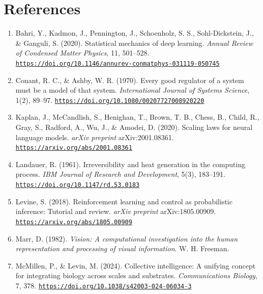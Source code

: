 \documentclass[11pt]{article}
\begin{document}
\section{References}
\begin{enumerate}
\setlength{\itemsep}{0.6em}
\item \label{ref:bahri2020}
Bahri, Y., Kadmon, J., Pennington, J., Schoenholz, S. S., Sohl-Dickstein, J., \& Ganguli, S. (2020). Statistical mechanics of deep learning. \textit{Annual Review of Condensed Matter Physics}, 11, 501--528.
\href{https://doi.org/10.1146/annurev-conmatphys-031119-050745}{\nolinkurl{https://doi.org/10.1146/annurev-conmatphys-031119-050745}}

\item \label{ref:conant1970}
Conant, R. C., \& Ashby, W. R. (1970). Every good regulator of a system must be a model of that system. \textit{International Journal of Systems Science}, 1(2), 89--97.
\href{https://doi.org/10.1080/00207727008920220}{\nolinkurl{https://doi.org/10.1080/00207727008920220}}

\item \label{ref:kaplan2020}
Kaplan, J., McCandlish, S., Henighan, T., Brown, T. B., Chess, B., Child, R., Gray, S., Radford, A., Wu, J., \& Amodei, D. (2020). Scaling laws for neural language models. \textit{arXiv preprint} arXiv:2001.08361.
\href{https://arxiv.org/abs/2001.08361}{\nolinkurl{https://arxiv.org/abs/2001.08361}}

\item \label{ref:landauer1961}
Landauer, R. (1961). Irreversibility and heat generation in the computing process. \textit{IBM Journal of Research and Development}, 5(3), 183--191.
\href{https://doi.org/10.1147/rd.53.0183}{\nolinkurl{https://doi.org/10.1147/rd.53.0183}}

\item \label{ref:levine2018}
Levine, S. (2018). Reinforcement learning and control as probabilistic inference: Tutorial and review. \textit{arXiv preprint} arXiv:1805.00909.
\href{https://arxiv.org/abs/1805.00909}{\nolinkurl{https://arxiv.org/abs/1805.00909}}

\item \label{ref:marr1982}
Marr, D. (1982). \textit{Vision: A computational investigation into the human representation and processing of visual information}. W. H. Freeman.

\item \label{ref:mcmillen2024}
McMillen, P., \& Levin, M. (2024). Collective intelligence: A unifying concept for integrating biology across scales and substrates. \textit{Communications Biology}, 7, 378.
\href{https://doi.org/10.1038/s42003-024-06034-3}{\nolinkurl{https://doi.org/10.1038/s42003-024-06034-3}}


\end{enumerate}
\end{document}
